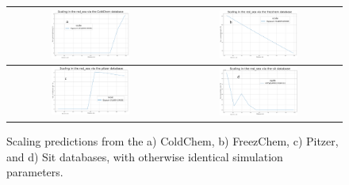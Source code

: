 \begin{figure}[h]
    \centering
    \begin{tabular}{c|c}
        \includegraphics[width=0.49\textwidth]{images/sensitivity_analyses/databases/ColdChem.png} 
        & \includegraphics[width=0.49\textwidth]{images/sensitivity_analyses/databases/FreezChem.png} \\ \midrule 
        \includegraphics[width=0.49\textwidth]{images/sensitivity_analyses/databases/Pitzer.png} 
        & \includegraphics[width=0.49\textwidth]{images/sensitivity_analyses/databases/Sit.png} 
        \\ \bottomrule
    \end{tabular}
    \caption{
        Scaling predictions from the a) ColdChem, b) FreezChem, c) Pitzer, and d) Sit databases, with otherwise identical simulation parameters.
    }
    \label{database_selection}
\end{figure}

